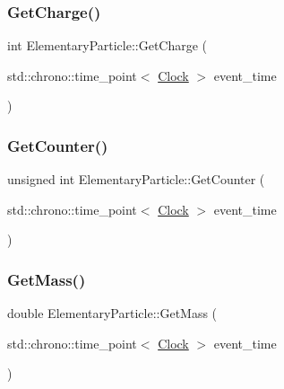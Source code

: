 \subsubsection{\texorpdfstring{Get\+Charge()}{GetCharge()}}
{\footnotesize\ttfamily int Elementary\+Particle\+::\+Get\+Charge (\begin{DoxyParamCaption}\item[{std\+::chrono\+::time\+\_\+point$<$ \mbox{\hyperlink{universe_8h_a0ef8d951d1ca5ab3cfaf7ab4c7a6fd80}{Clock}} $>$}]{event\+\_\+time }\end{DoxyParamCaption})\hspace{0.3cm}{\ttfamily [inline]}}

\mbox{\label{classElementaryParticle_a371b9b9bc520047c42d9e6d06b7f3dd9}} 
\subsubsection{\texorpdfstring{Get\+Counter()}{GetCounter()}}
{\footnotesize\ttfamily unsigned int Elementary\+Particle\+::\+Get\+Counter (\begin{DoxyParamCaption}\item[{std\+::chrono\+::time\+\_\+point$<$ \mbox{\hyperlink{universe_8h_a0ef8d951d1ca5ab3cfaf7ab4c7a6fd80}{Clock}} $>$}]{event\+\_\+time }\end{DoxyParamCaption})\hspace{0.3cm}{\ttfamily [inline]}}

\mbox{\label{classElementaryParticle_a85400dc97f66c1ce23d9d961ddb6b8f3}} 
\subsubsection{\texorpdfstring{Get\+Mass()}{GetMass()}}
{\footnotesize\ttfamily double Elementary\+Particle\+::\+Get\+Mass (\begin{DoxyParamCaption}\item[{std\+::chrono\+::time\+\_\+point$<$ \mbox{\hyperlink{universe_8h_a0ef8d951d1ca5ab3cfaf7ab4c7a6fd80}{Clock}} $>$}]{event\+\_\+time }\end{DoxyParamCaption})\hspace{0.3cm}{\ttfamily [inline]}}


